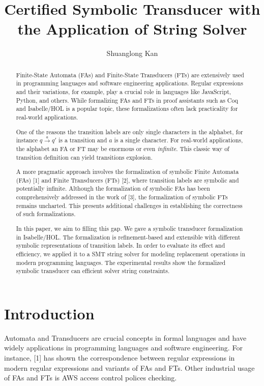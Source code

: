 \documentclass[a4paper,UKenglish,cleveref, autoref, thm-restate]{lipics-v2021}
\title{Certified Symbolic Transducer with the Application of String Solver} %
\author{Shuanglong Kan}{Barkhausen Institut, Germany \and \url{https://github.com/ShlKan} }{shuanglongkan@gmail.com}{https://orcid.org/0000-0002-1825-0097}{(Optional) author-specific funding acknowledgements}%
\begin{document}
\maketitle

\begin{abstract}
Finite-State Automata (FAs) and Finite-State Transducers (FTs) are extensively used in programming languages and software engineering applications. Regular expressions and their variations, for example, play a crucial role in languages like JavaScript, Python, and others. While formalizing FAs and FTs in proof assistants such as Coq and Isabelle/HOL is a popular topic, these formalizations often lack practicality for real-world applications. 

One of the reasons the transition labels are only single characters in the alphabet, for instance $q\xrightarrow{a} q'$ is a transition and $a$ is a single character. For real-world applications, the alphabet an FA or FT may be enormous or even \emph{infinite}. This classic way of transition definition can yield transitions explosion. 


A more pragmatic approach involves the formalization of symbolic Finite Automata (FAs) [1] and Finite Transducers (FTs) [2], where transition labels are symbolic and potentially infinite. Although the formalization of symbolic FAs has been comprehensively addressed in the work of [3], the formalization of symbolic FTs remains uncharted. This presents additional challenges in establishing the correctness of such formalizations.


In this paper, we aim to filling this gap. We gave a symbolic transducer formalization in Isabelle/HOL. The formalization is refinement-based and extensible with different symbolic representations of transition labels. In order to evaluate its effect and efficiency, we applied it to a  SMT string solver for modeling replacement operations in modern programming languages. The experimental results show the formalized symbolic transducer can efficient solver string constraints.


\end{abstract}

\section{Introduction}
\label{sec:introduction}

Automata and Transducers are crucial concepts in formal languages and have widely applications in programming languages and software engineering. For instance, [1] has shown the correspondence between  regular expressions in modern regular expressions and variants of FAs and FTs. Other industrial usage of FAs and FTs is AWS access control polices checking.
\end{document}
